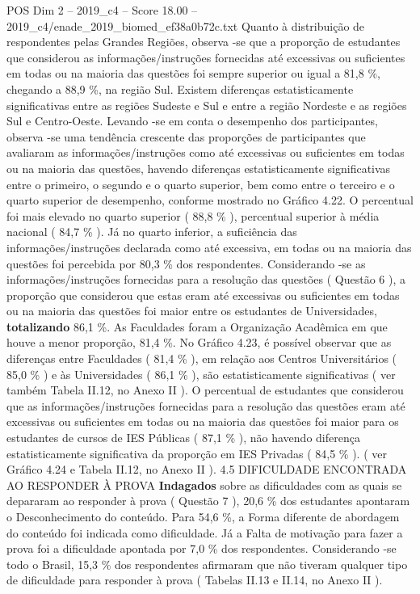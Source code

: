 \begin{textsample}{POS Dim 2 – 2019\_c4 – Score 18.00 – 2019\_c4/enade\_2019\_biomed\_ef38a0b72c.txt}
Quanto à distribuição de respondentes pelas Grandes Regiões, observa -se que a proporção de estudantes que considerou as informações/instruções fornecidas até excessivas ou suficientes em todas ou na maioria das questões foi sempre superior ou igual a 81,8 \%, chegando a 88,9 \%, na região Sul.
Existem diferenças estatisticamente significativas entre as regiões Sudeste e Sul e entre a região Nordeste e as regiões Sul e Centro-Oeste.
Levando -se em conta o desempenho dos participantes, observa -se uma tendência crescente das proporções de participantes que avaliaram as informações/instruções como até excessivas ou suficientes em todas ou na maioria das questões, havendo diferenças estatisticamente significativas entre o primeiro, o segundo e o quarto superior, bem como entre o terceiro e o quarto superior de desempenho, conforme mostrado no Gráfico 4.22.
O percentual foi mais elevado no quarto superior ( 88,8 \% ), percentual superior à média nacional ( 84,7 \% ).
Já no quarto inferior, a suficiência das informações/instruções declarada como até excessiva, em todas ou na maioria das questões foi percebida por 80,3 \% dos respondentes.
Considerando -se as informações/instruções fornecidas para a resolução das questões ( Questão 6 ), a proporção que considerou que estas eram até excessivas ou suficientes em todas ou na maioria das questões foi maior entre os estudantes de Universidades, \textbf{totalizando} 86,1 \%.
As Faculdades foram a Organização Acadêmica em que houve a menor proporção, 81,4 \%.
No Gráfico 4.23, é possível observar que as diferenças entre Faculdades ( 81,4 \% ), em relação aos Centros Universitários ( 85,0 \% ) e às Universidades ( 86,1 \% ), são estatisticamente significativas ( ver também Tabela II.12, no Anexo II ).
O percentual de estudantes que considerou que as informações/instruções fornecidas para a resolução das questões eram até excessivas ou suficientes em todas ou na maioria das questões foi maior para os estudantes de cursos de IES Públicas ( 87,1 \% ), não havendo diferença estatisticamente significativa da proporção em IES Privadas ( 84,5 \% ). ( ver Gráfico 4.24 e Tabela II.12, no Anexo II ). 4.5 DIFICULDADE ENCONTRADA AO RESPONDER À PROVA \textbf{Indagados} sobre as dificuldades com as quais se depararam ao responder à prova ( Questão 7 ), 20,6 \% dos estudantes apontaram o Desconhecimento do conteúdo.
Para 54,6 \%, a Forma diferente de abordagem do conteúdo foi indicada como dificuldade.
Já a Falta de motivação para fazer a prova foi a dificuldade apontada por 7,0 \% dos respondentes.
Considerando -se todo o Brasil, 15,3 \% dos respondentes afirmaram que não tiveram qualquer tipo de dificuldade para responder à prova ( Tabelas II.13 e II.14, no Anexo II ).

\end{textsample}
